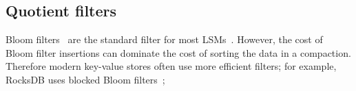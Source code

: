 %
%
%
%

\subsection{Quotient filters}

Bloom filters~\cite{DBLP:journals/cacm/Bloom70} are the standard filter for
most LSMs~\cite{leveldb,facebook-rocksdb2018,DBLP:conf/sosp/RajuKCA17}.
However, the cost of Bloom filter insertions can dominate the cost of sorting
the data in a compaction. Therefore modern key-value stores often use more
efficient filters; for example, RocksDB uses blocked Bloom
filters~\cite{DBLP:journals/jea/PutzeSS09};

